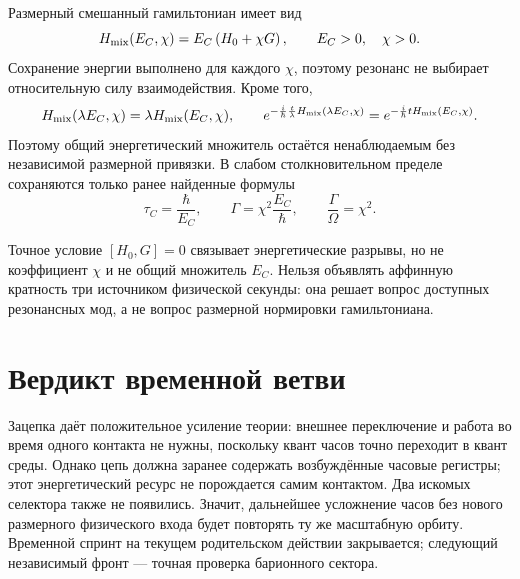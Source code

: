 Размерный смешанный гамильтониан имеет вид
\begin{equation}
 H_{\rm mix}(E_C,\chi)=E_C\left(H_0+\chi G\right),
 \qquad E_C>0,\quad\chi>0.
 \label{eq:v8-mixed-parent-dimensional-family}
\end{equation}
Сохранение энергии выполнено для каждого $\chi$, поэтому резонанс не
выбирает относительную силу взаимодействия. Кроме того,
\begin{equation}
 H_{\rm mix}(\lambda E_C,\chi)=
 \lambda H_{\rm mix}(E_C,\chi),
 \qquad
 e^{-\frac{i}{\hbar}\frac{t}{\lambda}
 H_{\rm mix}(\lambda E_C,\chi)}
 =e^{-\frac{i}{\hbar}tH_{\rm mix}(E_C,\chi)}.
 \label{eq:v8-mixed-parent-scale-orbit}
\end{equation}
Поэтому общий энергетический множитель остаётся ненаблюдаемым без
независимой размерной привязки. В слабом столкновительном пределе
сохраняются только ранее найденные формулы
\begin{equation}
 \tau_C=\frac{\hbar}{E_C},
 \qquad
 \Gamma=\chi^2\frac{E_C}{\hbar},
 \qquad
 \frac{\Gamma}{\Omega}=\chi^2.
 \label{eq:v8-mixed-parent-rate}
\end{equation}

\begin{nogocriterion}
Точное условие $[H_0,G]=0$ связывает энергетические разрывы, но не
коэффициент $\chi$ и не общий множитель $E_C$. Нельзя объявлять аффинную
кратность три источником физической секунды: она решает вопрос доступных
резонансных мод, а не вопрос размерной нормировки гамильтониана.
\end{nogocriterion}

\section{Вердикт временной ветви}

Зацепка даёт положительное усиление теории: внешнее переключение и работа
во время одного контакта не нужны, поскольку квант часов точно переходит в
квант среды. Однако цепь должна заранее содержать возбуждённые часовые
регистры; этот энергетический ресурс не порождается самим контактом. Два
искомых селектора также не появились. Значит,
дальнейшее усложнение часов без нового размерного физического входа будет
повторять ту же масштабную орбиту. Временной спринт на текущем
родительском действии закрывается; следующий независимый фронт --- точная
проверка барионного сектора.

